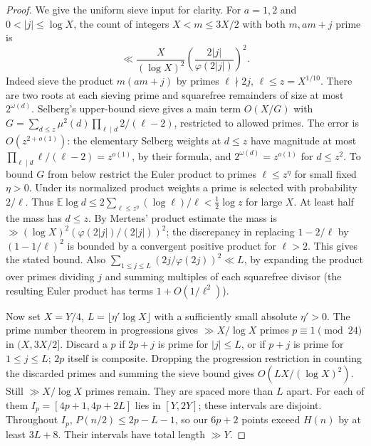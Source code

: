 \documentclass[11pt]{article}
\begin{document}
\begin{proof} We give the uniform sieve input for clarity. For $a=1,2$ and $0<|j|\le\log X$, the count of integers $X<m\le3X/2$ with both $m,am+j$ prime is
\[
 \ll \frac{X}{(\log X)^2}\left(\frac{2|j|}{\varphi(2|j|)}\right)^2.
\]
Indeed sieve the product $m(am+j)$ by primes $\ell\nmid 2j$, $\ell\le z=X^{1/10}$. There are two roots at each sieving prime and squarefree remainders of size at most $2^{\omega(d)}$. Selberg's upper-bound sieve \cite[Theorem 1.1]{oh} gives a main term $O(X/G)$ with $G=\sum_{d\le z}\mu^2(d)\prod_{\ell\mid d}2/(\ell-2)$, restricted to allowed primes. The error is $O(z^{2+o(1)})$: the elementary Selberg weights at $d\le z$ have magnitude at most $\prod_{\ell\mid d}\ell/(\ell-2)=z^{o(1)}$, by their formula, and $2^{\omega(d)}=z^{o(1)}$ for $d\le z^2$. To bound $G$ from below restrict the Euler product to primes $\ell\le z^{\eta}$ for small fixed $\eta>0$. Under its normalized product weights a prime is selected with probability $2/\ell$. Thus $\mathbb E\log d\le 2\sum_{\ell\le z^{\eta}}(\log\ell)/\ell<\tfrac12\log z$ for large $X$. At least half the mass has $d\le z$. By Mertens' product estimate the mass is $\gg(\log X)^2(\varphi(2|j|)/(2|j|))^2$; the discrepancy in replacing $1-2/\ell$ by $(1-1/\ell)^2$ is bounded by a convergent positive product for $\ell>2$. This gives the stated bound. Also $\sum_{1\le j\le L}(2j/\varphi(2j))^2\ll L$, by expanding the product over primes dividing $j$ and summing multiples of each squarefree divisor (the resulting Euler product has terms $1+O(1/\ell^2)$).

Now set $X=Y/4$, $L=\lfloor\eta'\log X\rfloor$ with a sufficiently small absolute $\eta'>0$. The prime number theorem in progressions gives $\gg X/\log X$ primes $p\equiv1\pmod{24}$ in $(X,3X/2]$. Discard a $p$ if $2p+j$ is prime for $|j|\le L$, or if $p+j$ is prime for $1\le j\le L$; $2p$ itself is composite. Dropping the progression restriction in counting the discarded primes and summing the sieve bound gives $O(LX/(\log X)^2)$. Still $\gg X/\log X$ primes remain. They are spaced more than $L$ apart. For each of them $I_p=[4p+1,4p+2L]$ lies in $[Y,2Y]$; these intervals are disjoint. Throughout $I_p$, $P(n/2)\le2p-L-1$, so our $6p+2$ points exceed $H(n)$ by at least $3L+8$. Their intervals have total length $\gg Y$.\end{proof}
\end{document}

